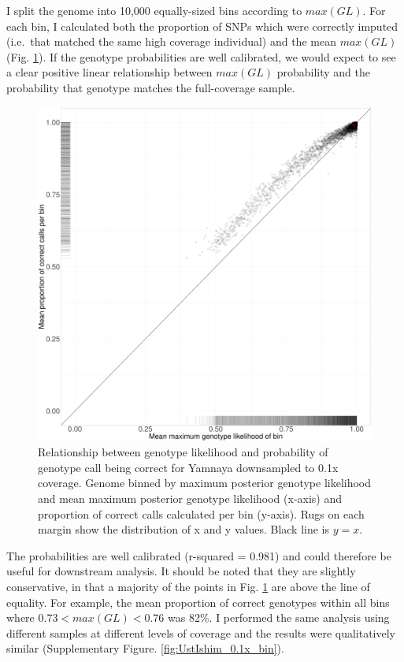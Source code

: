 I split the genome into 10,000 equally-sized bins according to $max(GL)$. For each bin, I calculated both the proportion of SNPs which were correctly imputed (i.e.\ that matched the same high coverage individual) and the mean $max(GL)$ (Fig. \ref{fig:Yamnaya_0.1x_GL_calibration}). If the genotype probabilities are well calibrated, we would expect to see a clear positive linear relationship between $max(GL)$ probability and the probability that genotype matches the full-coverage sample.

\begin{figure}[htp]
    \centering
    \includegraphics[width=1.0\textwidth]{../images/chapter1/Yamnaya_0.1x_bin.pdf}
    \caption{Relationship between genotype likelihood and probability of genotype call being correct for Yamnaya downsampled to 0.1x coverage. Genome binned by maximum posterior genotype likelihood and mean maximum posterior genotype likelihood (x-axis) and proportion of correct calls calculated per bin (y-axis). Rugs on each margin show the distribution of x and y values. Black line is $y=x$.}
    \label{fig:Yamnaya_0.1x_GL_calibration}
\end{figure}

The probabilities are well calibrated (r-squared = 0.981) and could therefore be useful for downstream analysis. It should be noted that they are slightly conservative, in that a majority of the points in Fig. \ref{fig:Yamnaya_0.1x_GL_calibration} are above the line of equality. For example, the mean proportion of correct genotypes within all bins where $0.73 < max(GL) < 0.76$ was 82\%. I performed the same analysis using different samples at different levels of coverage and the results were qualitatively similar (Supplementary Figure. \ref{fig:UstIshim_0.1x_bin}).

